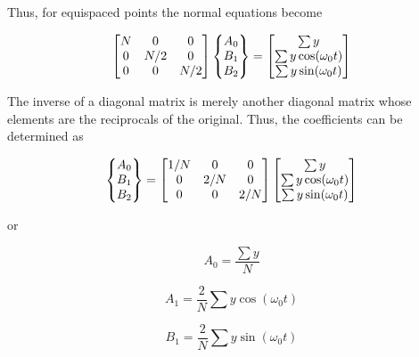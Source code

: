 \documentclass[../main.tex]{subfiles}
\begin{document}
\noindent Thus, for equispaced points the normal equations become

\begin{equation}
	\notag
	\begin{bmatrix}
		N & 0 & 0 \\
		0 & N/2 & 0 \\
		0 & 0 & N/2
	\end{bmatrix}
	\begin{Bmatrix}
		A_0 \\ B_1 \\ B_2
	\end{Bmatrix}
	=
	\begin{bmatrix}
		\sum y \\
		\sum y \cos(\omega_0 t) \\
		\sum y \sin(\omega_0 t)
	\end{bmatrix}
\end{equation}

\noindent The inverse of a diagonal matrix is merely another diagonal matrix whose elements are the
reciprocals of the original. Thus, the coefficients can be determined as

\begin{equation}
	\notag
	\begin{Bmatrix}
		A_0 \\ B_1 \\ B_2
	\end{Bmatrix}
	=
	\begin{bmatrix}
		1/N & 0 & 0 \\
		0 & 2/N & 0 \\
		0 & 0 & 2/N
	\end{bmatrix}
	\begin{bmatrix}
		\sum y \\
		\sum y \cos(\omega_0 t) \\
		\sum y \sin(\omega_0 t)
	\end{bmatrix}
\end{equation}

\noindent or

\begin{equation}
	\tag{16.14}
	A_0 = \frac{\sum y}{N}
\end{equation}

\begin{equation}
	\tag{16.15}
	A_1 =\frac{2}{N} \sum y \cos(\omega_0 t)
\end{equation}

\begin{equation}
	\tag{16.16}
	B_1 = \frac{2}{N} \sum y \sin(\omega_0 t)
\end{equation}
\end{document}
